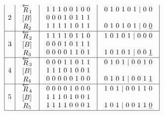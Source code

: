 $$\begin{array}{c}
\begin{array}{|c|c|c|c|}
2 & \begin{array}{c}\overleftarrow{R}_1 \\  \left[B\right]_{\textup{}} \\ R_2\end{array} & \begin{array}{c}1\ 1\ 1\ 0\ 0\ 1\ 0\ 0 \\ 0\ 0\ 0\ 1\ 0\ 1\ 1\ 1 \\ 1\ 1\ 1\ 1\ 1\ 0\ 1\ 1\end{array} & \begin{array}{c}0\ 1\ 0\ 1\ 0\ 1\ |\ 0\ 0 \\  \\ 0\ 1\ 0\ 1\ 0\ 1\ |\ 0\ \underline{0}\end{array} \\ \hline 
3 & \begin{array}{c}\overleftarrow{R}_2 \\  \left[B\right]_{\textup{}} \\ R_3\end{array} & \begin{array}{c}1\ 1\ 1\ 1\ 0\ 1\ 1\ 0 \\ 0\ 0\ 0\ 1\ 0\ 1\ 1\ 1 \\ 0\ 0\ 0\ 0\ 1\ 1\ 0\ 1\end{array} & \begin{array}{c}1\ 0\ 1\ 0\ 1\ |\ 0\ 0\ 0 \\  \\ 1\ 0\ 1\ 0\ 1\ |\ 0\ 0\ \underline{1}\end{array} \\ \hline 
4 & \begin{array}{c}\overleftarrow{R}_3 \\  \left[B\right]_{\textup{}} \\ R_4\end{array} & \begin{array}{c}0\ 0\ 0\ 1\ 1\ 0\ 1\ 1 \\ 1\ 1\ 1\ 0\ 1\ 0\ 0\ 1 \\ 0\ 0\ 0\ 0\ 0\ 1\ 0\ 0\end{array} & \begin{array}{c}0\ 1\ 0\ 1\ |\ 0\ 0\ 1\ 0 \\  \\ 0\ 1\ 0\ 1\ |\ 0\ 0\ 1\ \underline{1}\end{array} \\ \hline 
5 & \begin{array}{c}\overleftarrow{R}_4 \\  \left[B\right]_{\textup{}} \\ R_5\end{array} & \begin{array}{c}0\ 0\ 0\ 0\ 1\ 0\ 0\ 0 \\ 1\ 1\ 1\ 0\ 1\ 0\ 0\ 1 \\ 1\ 1\ 1\ 1\ 0\ 0\ 0\ 1\end{array} & \begin{array}{c}1\ 0\ 1\ |\ 0\ 0\ 1\ 1\ 0 \\  \\ 1\ 0\ 1\ |\ 0\ 0\ 1\ 1\ \underline{0}\end{array} \\ \hline 

\end{array}
\end{array}$$
